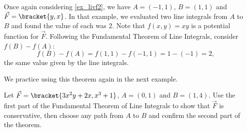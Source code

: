 Once again considering \autoref{ex_livf2}, we have $A = (-1,1)$, $B = (1,1)$ and $\vec F =\bracket{y,x}$. In that example, we evaluated two line integrals from $A$ to $B$ and found the value of each was 2. Note that $f(x,y) = xy$ is a potential function for $\vec F$. Following the Fundamental Theorem of Line Integrals, consider $f(B) - f(A)$:
\[f(B) - f(A) = f(1,1) - f(-1,1) = 1 - (-1) = 2,\]
the same value given by the line integrals.


We practice using this theorem again in the next example.

{Let $\vec F =\bracket{3x^2y+2x, x^3+1}$, $A = (0,1)$ and $B = (1,4)$. Use the first part of the Fundamental Theorem of Line Integrals to show that $\vec F$ is conservative, then choose any path from $A$ to $B$ and confirm the second part of the theorem.
}
